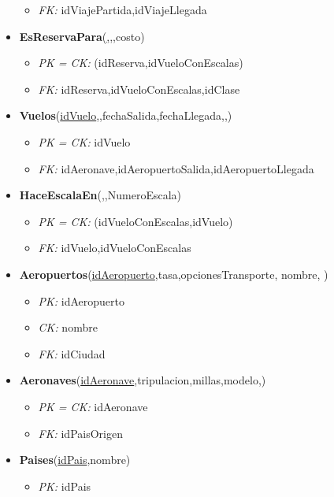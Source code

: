 \begin{itemize}
\begin{itemize}
			\item \textit{FK: } idViajePartida,idViajeLlegada
		\end{itemize}
	\item \textbf{EsReservaPara}(\underline{,},,costo)
		\begin{itemize}
			\item \textit{PK = CK: } (idReserva,idVueloConEscalas)
			\item \textit{FK: } idReserva,idVueloConEscalas,idClase
		\end{itemize}
	\item \textbf{Vuelos}(\underline{idVuelo},,fechaSalida,fechaLlegada,,)
		\begin{itemize}
			\item \textit{PK = CK:} idVuelo
			\item \textit{FK: } idAeronave,idAeropuertoSalida,idAeropuertoLlegada
		\end{itemize}
	\item \textbf{HaceEscalaEn}(\underline{,},NumeroEscala)
		\begin{itemize}
			\item \textit{PK = CK:} (idVueloConEscalas,idVuelo)
			\item \textit{FK: } idVuelo,idVueloConEscalas
		\end{itemize}
	\item \textbf{Aeropuertos}(\underline{idAeropuerto},tasa,opcionesTransporte, nombre, )
		\begin{itemize}
			\item \textit{PK: } idAeropuerto
			\item \textit{CK: } nombre
			\item \textit{FK: } idCiudad
		\end{itemize}
	\item \textbf{Aeronaves}(\underline{idAeronave},tripulacion,millas,modelo,)
		\begin{itemize}
			\item \textit{PK = CK: } idAeronave
			\item \textit{FK: } idPaisOrigen
		\end{itemize}
	\item \textbf{Paises}(\underline{idPais},nombre)
		\begin{itemize}
			\item \textit{PK: } idPais

\end{itemize}
\end{itemize}
